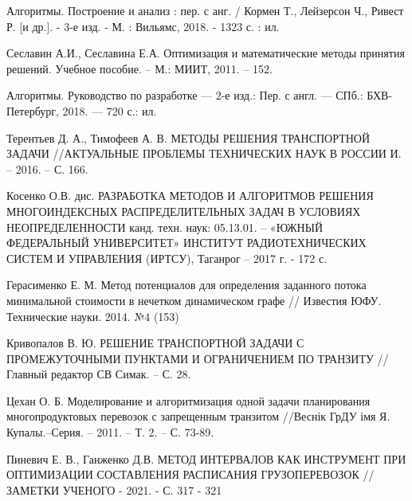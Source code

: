 \begin{thebibliography}{}
	  Алгоритмы. Построение и анализ : пер. с анг. / Кормен Т., Лейзерсон Ч., Ривест Р. [и др.]. - 3-е изд. - М. : Вильямс, 2018. - 1323 с. : ил.
	
	 Сеславин А.И., Сеславина Е.А. Оптимизация и математические методы принятия решений. Учебное пособие. – М.: МИИТ, 2011. – 152. 
	
	 Алгоритмы. Руководство по разработке --- 2-е изд.: Пер. с англ. --- СПб.: БХВ-Петербург, 2018. --- 720 с.: ил.
	
	 Терентьев Д. А., Тимофеев А. В. МЕТОДЫ РЕШЕНИЯ ТРАНСПОРТНОЙ ЗАДАЧИ //АКТУАЛЬНЫЕ ПРОБЛЕМЫ ТЕХНИЧЕСКИХ НАУК В РОССИИ И. – 2016. – С. 166.
	
	 Косенко О.В. дис. РАЗРАБОТКА МЕТОДОВ И АЛГОРИТМОВ РЕШЕНИЯ МНОГОИНДЕКСНЫХ РАСПРЕДЕЛИТЕЛЬНЫХ ЗАДАЧ В УСЛОВИЯХ НЕОПРЕДЕЛЕННОСТИ канд. техн. наук: 05.13.01. -- «ЮЖНЫЙ ФЕДЕРАЛЬНЫЙ УНИВЕРСИТЕТ» ИНСТИТУТ РАДИОТЕХНИЧЕСКИХ СИСТЕМ И УПРАВЛЕНИЯ (ИРТСУ), Таганрог -- 2017 г. - 172 с.
	
	 Герасименко Е. М. Метод потенциалов для определения заданного потока минимальной стоимости в нечетком динамическом графе // Известия ЮФУ. Технические науки. 2014. №4 (153)
	
	 Кривопалов В. Ю. РЕШЕНИЕ ТРАНСПОРТНОЙ ЗАДАЧИ С ПРОМЕЖУТОЧНЫМИ ПУНКТАМИ И ОГРАНИЧЕНИЕМ ПО ТРАНЗИТУ //Главный редактор СВ Симак. – С. 28.
	
	 Цехан О. Б. Моделирование и алгоритмизация одной задачи планирования многопродуктовых перевозок с запрещенным транзитом //Веснік ГрДУ імя Я. Купалы.–Серия. – 2011. – Т. 2. – С. 73-89.
	
	  Пиневич Е. В., Ганженко Д.В. МЕТОД ИНТЕРВАЛОВ КАК ИНСТРУМЕНТ ПРИ ОПТИМИЗАЦИИ СОСТАВЛЕНИЯ РАСПИСАНИЯ ГРУЗОПЕРЕВОЗОК // ЗАМЕТКИ УЧЕНОГО - 2021. - С. 317 - 321
	
\end{thebibliography}
\endgroup

\pagebreak